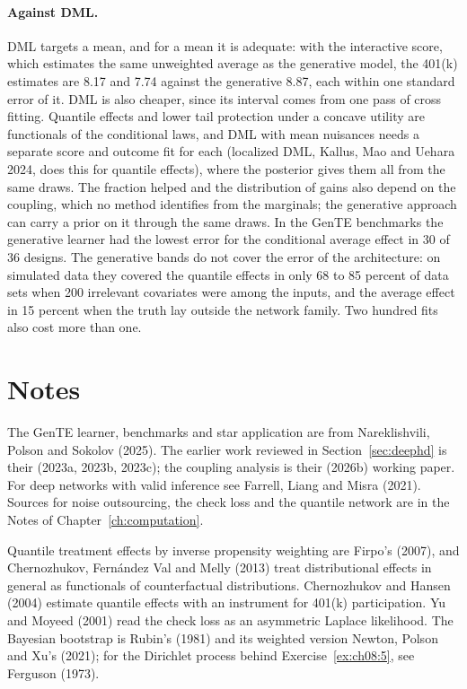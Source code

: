 \paragraph{Against DML.} DML targets a mean, and for a mean it is adequate: with the interactive score, which estimates the same unweighted average as the generative model, the 401(k) estimates are 8.17 and 7.74 against the generative 8.87, each within one standard error of it. DML is also cheaper, since its interval comes from one pass of cross fitting. Quantile effects and lower tail protection under a concave utility are functionals of the conditional laws, and DML with mean nuisances needs a separate score and outcome fit for each (localized DML, Kallus, Mao and Uehara 2024, does this for quantile effects), where the posterior gives them all from the same draws. The fraction helped and the distribution of gains also depend on the coupling, which no method identifies from the marginals; the generative approach can carry a prior on it through the same draws. In the GenTE benchmarks the generative learner had the lowest error for the conditional average effect in 30 of 36 designs. The generative bands do not cover the error of the architecture: on simulated data they covered the quantile effects in only 68 to 85 percent of data sets when 200 irrelevant covariates were among the inputs, and the average effect in 15 percent when the truth lay outside the network family. Two hundred fits also cost more than one.

\section*{Notes}

The GenTE learner, benchmarks and star application are from Nareklishvili, Polson and Sokolov (2025). The earlier work reviewed in Section~\ref{sec:deephd} is their (2023a, 2023b, 2023c); the coupling analysis is their (2026b) working paper. For deep networks with valid inference see Farrell, Liang and Misra (2021). Sources for noise outsourcing, the check loss and the quantile network are in the Notes of Chapter~\ref{ch:computation}.

Quantile treatment effects by inverse propensity weighting are Firpo's (2007), and Chernozhukov, Fern\'andez Val and Melly (2013) treat distributional effects in general as functionals of counterfactual distributions. Chernozhukov and Hansen (2004) estimate quantile effects with an instrument for 401(k) participation. Yu and Moyeed (2001) read the check loss as an asymmetric Laplace likelihood. The Bayesian bootstrap is Rubin's (1981) and its weighted version Newton, Polson and Xu's (2021); for the Dirichlet process behind Exercise~\ref{ex:ch08:5}, see Ferguson (1973).

